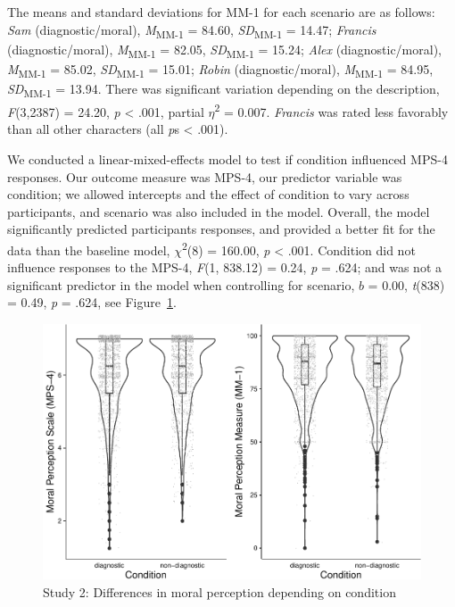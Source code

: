 \documentclass[
  english,
  man,floatsintext]{apa7}
\begin{document}
The means and standard deviations for MM-1 for each scenario are as follows:
\emph{Sam} (diagnostic/moral),
\emph{M}\textsubscript{MM-1} = 84.60, \emph{SD}\textsubscript{MM-1} = 14.47;
\emph{Francis} (diagnostic/moral),
\emph{M}\textsubscript{MM-1} = 82.05, \emph{SD}\textsubscript{MM-1} = 15.24;
\emph{Alex} (diagnostic/moral),
\emph{M}\textsubscript{MM-1} = 85.02, \emph{SD}\textsubscript{MM-1} = 15.01;
\emph{Robin} (diagnostic/moral),
\emph{M}\textsubscript{MM-1} = 84.95, \emph{SD}\textsubscript{MM-1} = 13.94. There was significant variation depending on the description, \emph{F}(3,2387) = 24.20, \emph{p} \textless{} .001, partial \(\eta\)\textsuperscript{2} = 0.007. \emph{Francis} was rated less favorably than all other characters (all \emph{p}s \textless{} .001).

We conducted a linear-mixed-effects model to test if condition influenced MPS-4 responses. Our outcome measure was MPS-4, our predictor variable was condition; we allowed intercepts and the effect of condition to vary across participants, and scenario was also included in the model.
Overall, the model significantly predicted participants responses, and provided a better fit for the data than the baseline model, \(\chi\)\textsuperscript{2}(8) = 160.00, \emph{p} \textless{} .001. Condition did not influence responses to the MPS-4, \emph{F}(1, 838.12) = 0.24, \emph{p} = .624; and was not a significant predictor in the model when controlling for scenario, \(b\) = 0.00, \emph{t}(838) = 0.49, \emph{p} = .624, see Figure~\ref{fig:S2bothconditionplot}.

\begin{figure}
\centering
\includegraphics{moral_dilution_in_chunks_files/figure-latex/S2bothconditionplot-1.pdf}
\caption{\label{fig:S2bothconditionplot}Study 2: Differences in moral perception depending on condition}
\end{figure}
\end{document}
